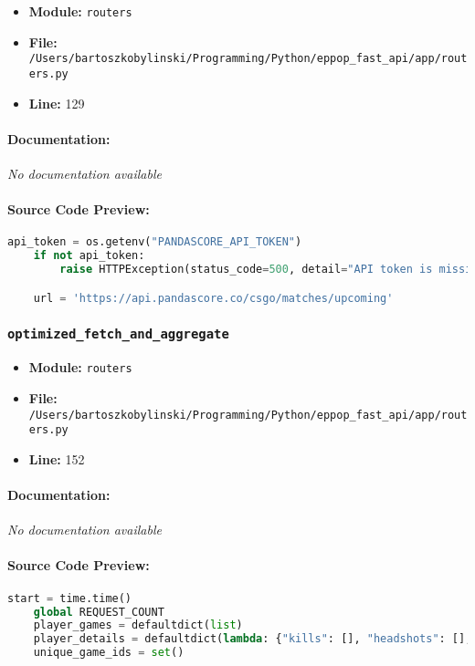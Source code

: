 \documentclass[11pt,a4paper]{article}
\begin{document}
\begin{itemize}
    \item \textbf{Module:} \texttt{routers}
    \item \textbf{File:} \texttt{/Users/bartoszkobylinski/Programming/Python/eppop\_fast\_api/app/routers.py}
    \item \textbf{Line:} 129
\end{itemize}

\paragraph{Documentation:} \textit{No documentation available}

\paragraph{Source Code Preview:}
\begin{lstlisting}[language=Python]
    api_token = os.getenv("PANDASCORE_API_TOKEN")
    if not api_token:
        raise HTTPException(status_code=500, detail="API token is missing")

    url = 'https://api.pandascore.co/csgo/matches/upcoming'
\end{lstlisting}

\vspace{1em}
\subsubsection{\texttt{optimized\_fetch\_and\_aggregate}}

\begin{itemize}
    \item \textbf{Module:} \texttt{routers}
    \item \textbf{File:} \texttt{/Users/bartoszkobylinski/Programming/Python/eppop\_fast\_api/app/routers.py}
    \item \textbf{Line:} 152
\end{itemize}

\paragraph{Documentation:} \textit{No documentation available}

\paragraph{Source Code Preview:}
\begin{lstlisting}[language=Python]
    start = time.time()
    global REQUEST_COUNT
    player_games = defaultdict(list)
    player_details = defaultdict(lambda: {"kills": [], "headshots": [], "rounds": []})
    unique_game_ids = set()
\end{lstlisting}
\end{document}
